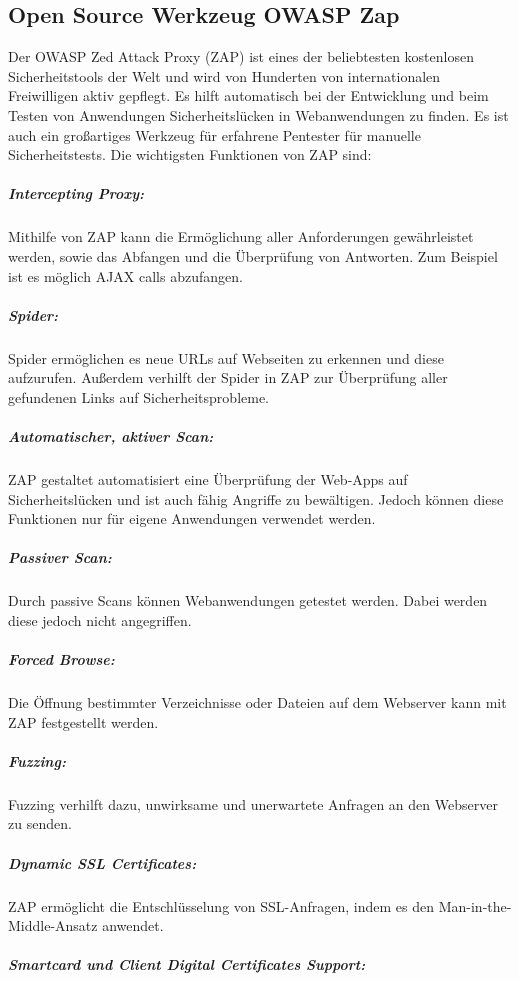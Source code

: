 \subsection{Open Source Werkzeug OWASP Zap}
\label{owaspzap-def}

Der OWASP Zed Attack Proxy (ZAP) ist eines der beliebtesten kostenlosen Sicherheitstools der Welt und wird von Hunderten von internationalen Freiwilligen aktiv gepflegt. Es hilft automatisch bei der Entwicklung und beim Testen von Anwendungen Sicherheitslücken in Webanwendungen zu finden. Es ist auch ein großartiges Werkzeug für erfahrene Pentester für manuelle Sicherheitstests\cite{owasp18def}. Die wichtigsten Funktionen von ZAP sind\cite{owaspfunktionen18}:

\subparagraph{Intercepting Proxy:}

Mithilfe von ZAP kann die Ermöglichung aller Anforderungen gewährleistet werden, sowie das Abfangen und die Überprüfung von Antworten. Zum Beispiel ist es möglich AJAX calls abzufangen.

\subparagraph{Spider:}

Spider ermöglichen es neue URLs auf Webseiten zu erkennen und diese aufzurufen. Außerdem verhilft der Spider in ZAP zur Überprüfung aller gefundenen Links auf Sicherheitsprobleme. 

\subparagraph{Automatischer, aktiver Scan:}

ZAP gestaltet automatisiert eine Überprüfung der Web-Apps auf Sicherheitslücken und ist auch fähig Angriffe zu bewältigen. Jedoch können diese Funktionen nur für eigene Anwendungen verwendet werden. 

\subparagraph{Passiver Scan:}

Durch passive Scans können Webanwendungen getestet werden. Dabei werden diese jedoch nicht angegriffen. 

\subparagraph{Forced Browse:}

Die Öffnung bestimmter Verzeichnisse oder Dateien auf dem Webserver kann mit ZAP festgestellt werden. 

\subparagraph{Fuzzing:}

Fuzzing verhilft dazu, unwirksame und unerwartete Anfragen an den Webserver zu senden. 

\subparagraph{Dynamic SSL Certificates:}

ZAP ermöglicht die Entschlüsselung von SSL-Anfragen, indem es den Man-in-the-Middle-Ansatz anwendet.

\subparagraph{Smartcard und Client Digital Certificates Support:}

